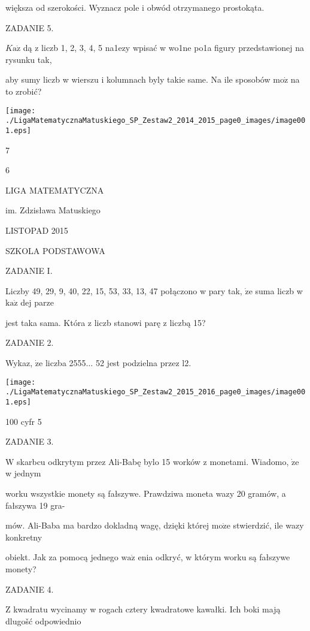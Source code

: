 \documentclass[a4paper,12pt]{article}
\begin{document}
większa od szerokości. Wyznacz pole i obwód otrzymanego prostokąta.

ZADANIE 5.

$K\mathrm{a}\dot{\mathrm{z}}$ dą z liczb 1, 2, 3, 4, 5 na1ezy wpisać w wo1ne po1a figury przedstawionej na rysunku tak,

aby sumy liczb w wierszu i kolumnach byly takie same. Na ile sposobów $\mathrm{m}\mathrm{o}\dot{\mathrm{z}}$ na to zrobić?
\begin{center}
\texttt{[image: ./LigaMatematycznaMatuskiego\_SP\_Zestaw2\_2014\_2015\_page0\_images/image001.eps]}
\end{center}
7

6






LIGA MATEMATYCZNA

im. Zdzisława Matuskiego

LISTOPAD 2015

SZKOLA PODSTAWOWA

ZADANIE I.

Liczby 49, 29, 9, 40, 22, 15, 53, 33, 13, 47 połączono w pary tak, $\dot{\mathrm{z}}\mathrm{e}$ suma liczb w $\mathrm{k}\mathrm{a}\dot{\mathrm{z}}$ dej parze

jest taka sama. Która z liczb stanowi parę z liczbą 15?

ZADANIE 2.

Wykaz, $\dot{\mathrm{z}}\mathrm{e}$ liczba 2555$\ldots$ 52 jest podzielna przez l2.
\begin{center}
\texttt{[image: ./LigaMatematycznaMatuskiego\_SP\_Zestaw2\_2015\_2016\_page0\_images/image001.eps]}
\end{center}
100 cyfr 5

ZADANIE 3.

$\mathrm{W}$ skarbcu odkrytym przez Ali-Babę bylo 15 worków z monetami. Wiadomo, $\dot{\mathrm{z}}\mathrm{e}$ w jednym

worku wszystkie monety są fałszywe. Prawdziwa moneta wazy 20 gramów, a fałszywa 19 gra-

mów. Ali-Baba ma bardzo dokladną wagę, dzięki której $\mathrm{m}\mathrm{o}\dot{\mathrm{z}}\mathrm{e}$ stwierdzić, ile wazy konkretny

obiekt. Jak za pomocą jednego $\mathrm{w}\mathrm{a}\dot{\mathrm{z}}$ enia odkryć, w którym worku są fałszywe monety?

ZADANIE 4.

$\mathrm{Z}$ kwadratu wycinamy w rogach cztery kwadratowe kawałki. Ich boki mają dlugošć odpowiednio
\end{document}
